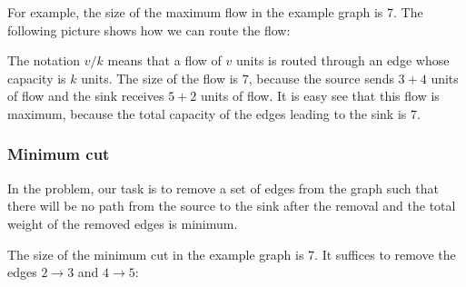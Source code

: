 For example, the size of the maximum flow
in the example graph is 7.
The following picture shows how we can
route the flow:

\begin{center}
\end{center}

The notation $v/k$ means
that a flow of $v$ units is routed through
an edge whose capacity is $k$ units.
The size of the flow is $7$,
because the source sends $3+4$ units of flow
and the sink receives $5+2$ units of flow.
It is easy see that this flow is maximum,
because the total capacity of the edges
leading to the sink is $7$.

\subsubsection{Minimum cut}


In the  problem,
our task is to remove a set
of edges from the graph
such that there will be no path from the source
to the sink after the removal
and the total weight of the removed edges
is minimum.

The size of the minimum cut in the example graph is 7.
It suffices to remove the edges $2 \rightarrow 3$
and $4 \rightarrow 5$:

